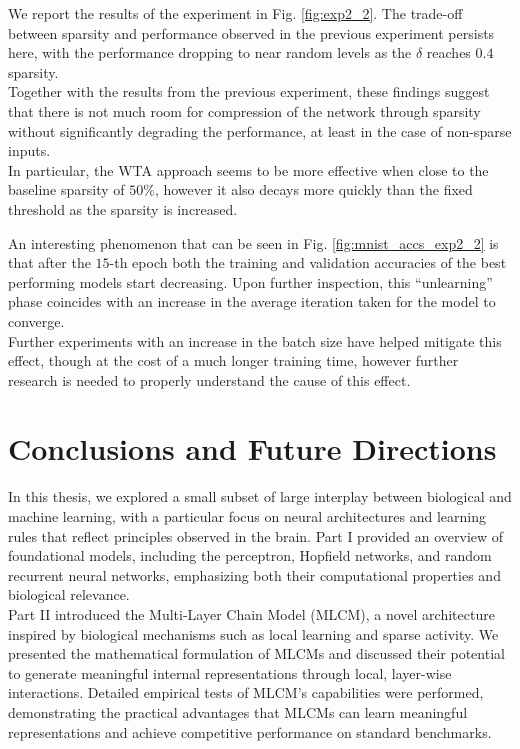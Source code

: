 \documentclass[a4paper,12pt]{report}
\begin{document}
We report the results of the experiment in Fig. \ref{fig:exp2_2}. The trade-off between 
sparsity and performance observed in the previous experiment persists here, with the 
performance dropping to near random levels as the $\delta$ reaches $0.4$ sparsity.\\
Together with the results from the previous experiment, these findings suggest that 
there is not much room for compression of the network through sparsity without 
significantly degrading the performance, at least in the case of non-sparse inputs.\\
In particular, the WTA approach seems to be more effective when close to the baseline 
sparsity of $50\%$, however it also decays more quickly than the fixed threshold as 
the sparsity is increased.

An interesting phenomenon that can be seen in Fig. \ref{fig:mnist_accs_exp2_2} is that
after the $15$-th epoch both the training and validation accuracies of the best 
performing models start decreasing. Upon further inspection, this  ``unlearning'' phase 
coincides with an increase in the average iteration taken for the model to converge. \\
Further experiments with an increase in the batch size have helped mitigate this effect, 
though at the cost of a much longer training time, however further research is needed 
to properly understand the cause of this effect. 

\chapter*{Conclusions and Future Directions}
In this thesis, we explored a small subset of large interplay between biological and 
machine learning, with a particular focus on neural architectures and learning rules 
that reflect principles observed in the brain. Part I provided an overview of 
foundational models, including the perceptron, Hopfield networks, and random recurrent 
neural networks, emphasizing both their computational properties and biological 
relevance. \\
Part II introduced the Multi-Layer Chain Model (MLCM), a novel architecture inspired 
by biological mechanisms such as local learning and sparse activity. We presented the 
mathematical formulation of MLCMs and discussed their potential to generate meaningful 
internal representations through local, layer-wise interactions. Detailed empirical  
tests of MLCM's capabilities were performed, demonstrating the practical advantages 
that MLCMs can learn meaningful representations and achieve competitive performance 
on standard benchmarks.
\end{document}
